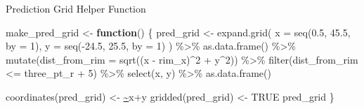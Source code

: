 \documentclass[
  9pt,
  ignorenonframetext,
  aspectratio=169]{beamer}
\newenvironment{Shaded}{\begin{snugshade}}{\end{snugshade}}
\newcommand{\AttributeTok}[1]{\textcolor[rgb]{0.00,0.34,0.68}{#1}}
\newcommand{\ConstantTok}[1]{\textcolor[rgb]{0.67,0.33,0.00}{#1}}
\newcommand{\ControlFlowTok}[1]{\textcolor[rgb]{0.12,0.11,0.11}{\textbf{#1}}}
\newcommand{\DecValTok}[1]{\textcolor[rgb]{0.69,0.50,0.00}{#1}}
\newcommand{\ErrorTok}[1]{\textcolor[rgb]{0.75,0.01,0.01}{\underline{#1}}}
\newcommand{\FloatTok}[1]{\textcolor[rgb]{0.69,0.50,0.00}{#1}}
\newcommand{\FunctionTok}[1]{\textcolor[rgb]{0.39,0.29,0.61}{#1}}
\newcommand{\NormalTok}[1]{\textcolor[rgb]{0.12,0.11,0.11}{#1}}
\newcommand{\OtherTok}[1]{\textcolor[rgb]{0.00,0.43,0.16}{#1}}
\newcommand{\SpecialCharTok}[1]{\textcolor[rgb]{0.24,0.68,0.91}{#1}}
\begin{document}
\begin{frame}[fragile]{Prediction Grid Helper Function}
\label{prediction-grid-helper-function}
\begin{Shaded}
\begin{Highlighting}[]
\NormalTok{make\_pred\_grid }\OtherTok{\textless{}{-}} \ControlFlowTok{function}\NormalTok{() \{}
\NormalTok{  pred\_grid }\OtherTok{\textless{}{-}} \FunctionTok{expand.grid}\NormalTok{(}
    \AttributeTok{x =} \FunctionTok{seq}\NormalTok{(}\FloatTok{0.5}\NormalTok{, }\FloatTok{45.5}\NormalTok{, }\AttributeTok{by =} \DecValTok{1}\NormalTok{),}
    \AttributeTok{y =} \FunctionTok{seq}\NormalTok{(}\SpecialCharTok{{-}}\FloatTok{24.5}\NormalTok{, }\FloatTok{25.5}\NormalTok{, }\AttributeTok{by =} \DecValTok{1}\NormalTok{)}
\NormalTok{  ) }\SpecialCharTok{\%\textgreater{}\%}
    \FunctionTok{as.data.frame}\NormalTok{() }\SpecialCharTok{\%\textgreater{}\%}
    \FunctionTok{mutate}\NormalTok{(}\AttributeTok{dist\_from\_rim =} \FunctionTok{sqrt}\NormalTok{((x }\SpecialCharTok{{-}}\NormalTok{ rim\_x)}\SpecialCharTok{\^{}}\DecValTok{2} \SpecialCharTok{+}\NormalTok{ y}\SpecialCharTok{\^{}}\DecValTok{2}\NormalTok{)) }\SpecialCharTok{\%\textgreater{}\%}
    \FunctionTok{filter}\NormalTok{(dist\_from\_rim }\SpecialCharTok{\textless{}=}\NormalTok{ three\_pt\_r }\SpecialCharTok{+} \DecValTok{5}\NormalTok{) }\SpecialCharTok{\%\textgreater{}\%}
    \FunctionTok{select}\NormalTok{(x, y) }\SpecialCharTok{\%\textgreater{}\%}
    \FunctionTok{as.data.frame}\NormalTok{()}
  
  \FunctionTok{coordinates}\NormalTok{(pred\_grid) }\OtherTok{\textless{}{-}} \ErrorTok{\textasciitilde{}}\NormalTok{x}\SpecialCharTok{+}\NormalTok{y}
  \FunctionTok{gridded}\NormalTok{(pred\_grid) }\OtherTok{\textless{}{-}} \ConstantTok{TRUE}
\NormalTok{  pred\_grid}
\NormalTok{\}}
\end{Highlighting}
\end{Shaded}
\end{frame}
\end{document}
